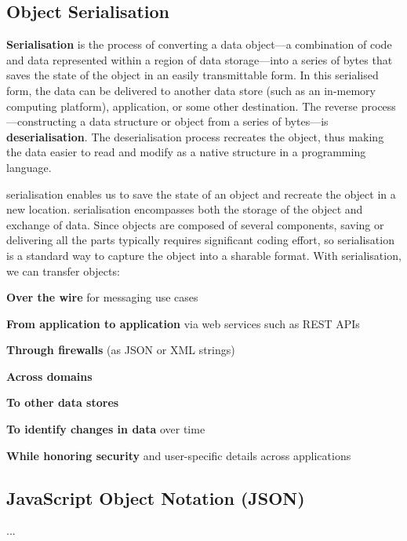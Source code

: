 \documentclass[../report.tex]{subfiles}
\begin{document}

\pagebreak

\subsection{Object Serialisation} %

\textbf{Serialisation} is the process of converting a data object—a combination of code and data represented within a region of data storage—into a series of bytes that saves the state of the object in an easily transmittable form. In this serialised form, the data can be delivered to another data store (such as an in-memory computing platform), application, or some other destination. The reverse process—constructing a data structure or object from a series of bytes—is \textbf{deserialisation}. The deserialisation process recreates the object, thus making the data easier to read and modify as a native structure in a programming language.

serialisation enables us to save the state of an object and recreate the object in a new location. serialisation encompasses both the storage of the object and exchange of data. Since objects are composed of several components, saving or delivering all the parts typically requires significant coding effort, so serialisation is a standard way to capture the object into a sharable format. With serialisation, we can transfer objects:

\textbf{Over the wire} for messaging use cases

\textbf{From application to application} via web services such as REST APIs

\textbf{Through firewalls} (as JSON or XML strings)

\textbf{Across domains}

\textbf{To other data stores}

\textbf{To identify changes in data} over time

\textbf{While honoring security} and user-specific details across applications

\subsection{JavaScript Object Notation (JSON)}

...
\end{document}
